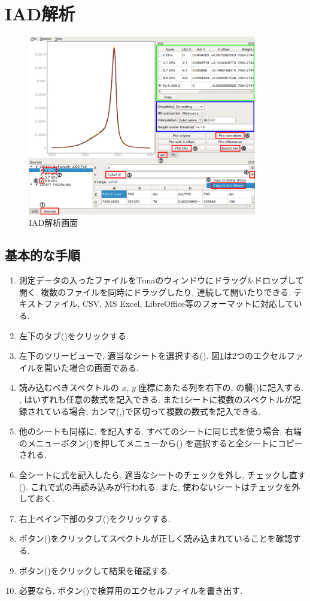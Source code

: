 \clearpage
\section{IAD解析}

\begin{figure}[H]
  \centering
  \includegraphics[width=10cm]{images/IAD-1.png}
  \caption{IAD解析画面}
  \label{fig:IAD-1}
\end{figure}

\subsection{基本的な手順}

\begin{enumerate}
\item 測定データの入ったファイルをTunaのウィンドウにドラッグ\&ドロップして開く.
  複数のファイルを同時にドラッグしたり, 連続して開いたりできる.
  テキストファイル, CSV, MS Excel, LibreOffice等のフォーマットに対応している.
\item 左下のタブ()をクリックする.
\item 左下のツリービューで, 適当なシートを選択する().
  図\ref{fig:IAD-1}は2つのエクセルファイルを開いた場合の画面である.
\item 読み込むべきスペクトルの $x$, $y$ 座標にあたる列を右下の, の欄()に記入する.
  , はいずれも任意の数式を記入できる.
  また1シートに複数のスペクトルが記録されている場合, カンマ(,)で区切って複数の数式を記入できる.
\item 他のシートも同様に, を記入する. すべてのシートに同じ式を使う場合,
  右端のメニューボタン()を押してメニューから()%
  を選択すると全シートにコピーされる.
\item 全シートに式を記入したら, 適当なシートのチェックを外し, チェックし直す().
  これで式の再読み込みが行われる. また, 使わないシートはチェックを外しておく.
\item 右上ペイン下部のタブ()をクリックする.
\item {}ボタン()をクリックしてスペクトルが正しく読み込まれていることを確認する.
\item {}ボタン()をクリックして結果を確認する.
\item 必要なら, ボタン()で検算用のエクセルファイルを書き出す.
\end{enumerate}

